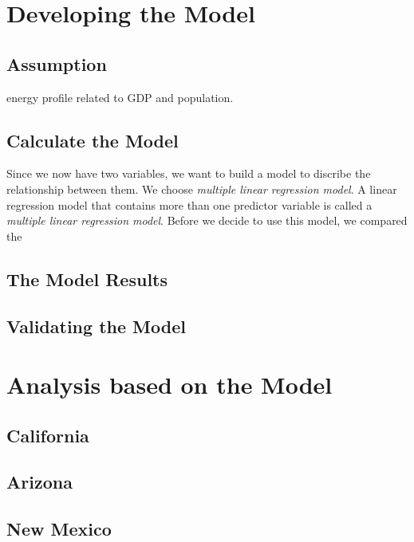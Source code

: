 \documentclass{mcmthesis}
\begin{document}
\section{Developing the Model}
\subsection{Assumption}
energy profile related to GDP and population.
\subsection{Calculate the Model}
Since we now have two variables, we want to build a model to discribe
the relationship between them. We choose \textit{multiple linear regression
model}. A linear regression model that contains more than one predictor variable
is called a \textit{multiple linear regression model}. Before we decide to use this
model, we compared the
\subsection{The Model Results}
\subsection{Validating the Model}

\section{Analysis based on the Model}
\subsection{California}
\subsection{Arizona}
\subsection{New Mexico}
\end{document}

